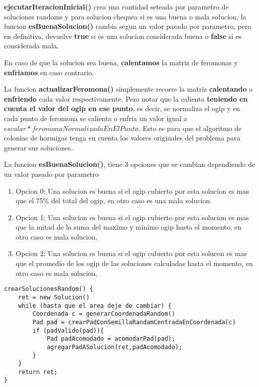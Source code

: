 \textbf{ejecutarIteracionInicial()} crea una cantidad seteada por parametro de soluciones randoms y para solucion chequea si es una buena o mala solucion, la funcion \textbf{esBuenaSolucion()} cambia segun un valor pasado por parametro, pero en definitiva, devuelve \textbf{true} si es una solucion considerada buena o \textbf{false} si es considerada mala. 

En caso de que la solucion sea buena, \textbf{calentamos} la matriz de feromonas y \textbf{enfriamos} en caso contrario.

La funcion \textbf{actualizarFeromona()} simplemente recorre la matriz \textbf{calentando} o \textbf{enfriendo} cada valor respectivamente. Pero notar que la calienta \textbf{teniendo en cuenta el valor del ogip en ese punto}, es decir, se normaliza el ogip y en cada punto de feromona se calienta o enfria un valor igual a $escalar * feromonaNormalizadaEnElPunto$. Esto es para que el algoritmo de colonias de hormigas tenga en cuenta los valores originales del problema para generar sus soluciones.


La funcion \textbf{esBuenaSolucion()}, tiene 3 opciones que se cambian dependiendo de un valor pasado por parametro

\begin{enumerate}
\item Opcion 0: Una solucion es buena si el ogip cubierto por esta solucion es mas que el 75\% del total del ogip, en otro caso es una mala solucion.
\item Opcion 1: Una solucion es buena si el ogip cubierto por esta solucion es mas que la mitad de la suma del maximo y minimo ogip hasta el momento, en otro caso es mala solucion.
\item Opcion 2: Una solucion es buena si el ogip cubierto por esta solucon es mas que el promedio de los ogip de las soluciones calculadas hasta el momento, en otro caso es mala solucion. 
\end{enumerate}



\begin{verbatim}	
crearSolucionesRandom() {
    ret = new Solucion()
    while (hasta que el area deje de cambiar) {
        Coordenada c = generarCoordenadaRandom()
        Pad pad = crearPadConSemillaRandamCentradaEnCoordenada(c)
        if (padValido(pad)){
            Pad padAcomodado = acomodarPad(pad);
            agregarPadASolucion(ret,padAcomodado);
        }
    }
    return ret;
}
\end{verbatim}	


